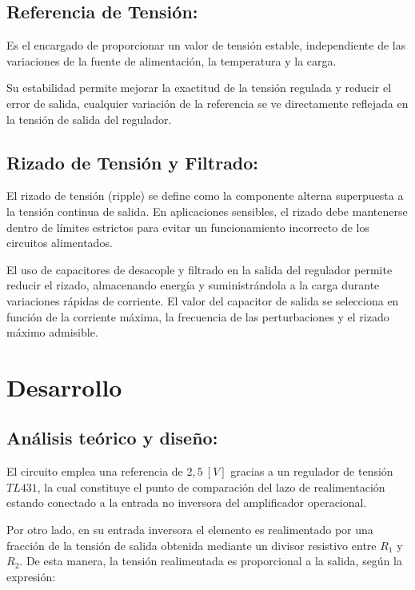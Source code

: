 \documentclass[12pt,a4paper]{article}
\begin{document}
\subsection{Referencia de Tensión:}

Es el encargado de proporcionar un valor de tensión estable, independiente de las variaciones de la fuente de alimentación, la temperatura y la carga.

Su estabilidad permite mejorar la exactitud de la tensión regulada y reducir el error de salida, cualquier variación de la referencia se ve directamente reflejada en la tensión de salida del regulador.
\\

\subsection{Rizado de Tensión y Filtrado:}

El rizado de tensión (ripple) se define como la componente alterna superpuesta a la tensión continua de salida. En aplicaciones sensibles, el rizado debe mantenerse dentro de límites estrictos para evitar un funcionamiento incorrecto de los circuitos alimentados.

El uso de capacitores de desacople y filtrado en la salida del regulador permite reducir el rizado, almacenando energía y suministrándola a la carga durante variaciones rápidas de corriente. El valor del capacitor de salida se selecciona en función de la corriente máxima, la frecuencia de las perturbaciones y el rizado máximo admisible.
\\
\newpage
\section{Desarrollo}
\subsection{Análisis teórico y diseño:}

El circuito emplea una referencia de $2,5~[V]$ gracias a un regulador de tensión $TL431$, la cual constituye el punto de comparación del lazo de realimentación estando conectado a la entrada no inversora del amplificador operacional.

Por otro lado, en su entrada inversora el elemento es realimentado por una fracción de la tensión de salida obtenida mediante un divisor resistivo entre $R_1$ y $R_2$. De esta manera, la tensión realimentada es proporcional a la salida, según la expresión:
\end{document}
